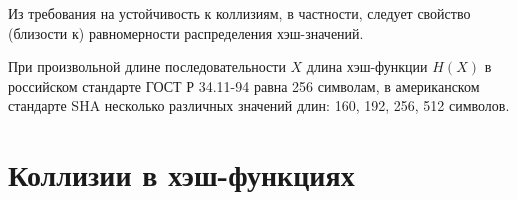 Из требования на устойчивость к коллизиям, в частности, следует свойство (близости к) равномерности распределения хэш-значений.

При произвольной длине последовательности $X$ длина хэш-функции $H(X)$ в российском стандарте ГОСТ Р 34.11-94 равна 256 символам, в американском стандарте SHA несколько различных значений длин: 160, 192, 256, 512 символов.







\section{Коллизии в хэш-функциях}




